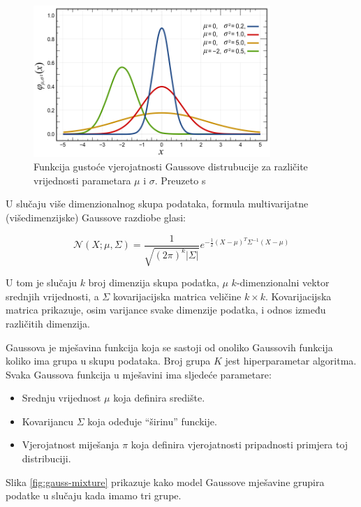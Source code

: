 \documentclass[utf8, diplomski, numeric]{fer}
\begin{document}
\begin{figure}[htb]
\includegraphics[width=0.8\textwidth]{images/gauss1.png}
\centering
\caption{Funkcija gustoće vjerojatnosti Gaussove distrubucije za različite vrijednosti parametara $\mu$ i $\sigma$. Preuzeto s  \cite{normalDistWiki}}
\label{fig:gauss1}
\end{figure}

U slučaju više dimenzionalnog skupa podataka, formula multivarijatne (višedimenzijske) Gaussove razdiobe glasi:

\begin{equation}
\mathcal{N}(X;\mu,\Sigma)  =\frac{1}{\sqrt{(2\pi)^{k}|\Sigma|}}e^{-\frac{1}{2}(X-\mu)^T\Sigma^{-1}(X-\mu)}
\end{equation}

U tom je slučaju $k$ broj dimenzija skupa podatka, $\mu$ $k$-dimenzionalni vektor srednjih vrijednosti, a $\Sigma$ kovarijacijska matrica veličine $k \times k$. Kovarijacijska matrica prikazuje, osim varijance svake dimenzije podatka, i odnos između različitih dimenzija.

Gaussova je mješavina funkcija koja se sastoji od onoliko Gaussovih funkcija koliko ima grupa u skupu podataka. Broj grupa $K$ jest hiperparametar algoritma. Svaka Gaussova funkcija u mješavini ima sljedeće parametare:

\begin{itemize}
\item Srednju vrijednost $\mu$ koja definira središte.
\item Kovarijancu $\Sigma$  koja odeđuje ``širinu'' funckije.
\item Vjerojatnost miješanja $\pi$ koja definira vjerojatnosti pripadnosti primjera toj distribuciji.
\end{itemize}

Slika \ref{fig:gauss-mixture} prikazuje kako model Gaussove mješavine grupira podatke u slučaju kada imamo tri grupe.
\end{document}
